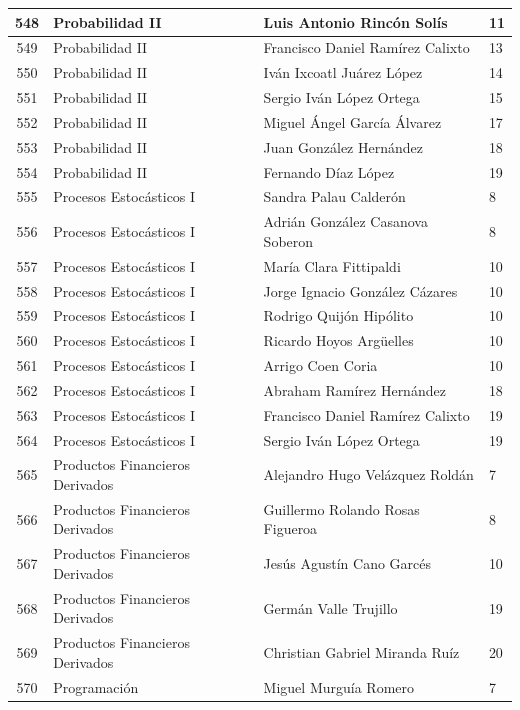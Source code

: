 {\begin{longtable}{|c|p{6.5cm}|p{5cm}|p{1.5cm}|}
  548 & Probabilidad II & Luis Antonio Rincón Solís & 11 \\ \hline
  549 & Probabilidad II & Francisco Daniel Ramírez Calixto & 13 \\ \hline
  550 & Probabilidad II & Iván Ixcoatl Juárez López & 14 \\ \hline
  551 & Probabilidad II & Sergio Iván López Ortega & 15 \\ \hline
  552 & Probabilidad II & Miguel Ángel García Álvarez & 17 \\ \hline
  553 & Probabilidad II & Juan González Hernández & 18 \\ \hline
  554 & Probabilidad II & Fernando Díaz López & 19 \\ \hline
  555 & Procesos Estocásticos I & Sandra Palau Calderón & 8 \\ \hline
  556 & Procesos Estocásticos I & Adrián González Casanova Soberon & 8 \\ \hline
  557 & Procesos Estocásticos I & María Clara Fittipaldi & 10 \\ \hline
  558 & Procesos Estocásticos I & Jorge Ignacio González Cázares & 10 \\ \hline
  559 & Procesos Estocásticos I & Rodrigo Quijón Hipólito & 10 \\ \hline
  560 & Procesos Estocásticos I & Ricardo Hoyos Argüelles & 10 \\ \hline
  561 & Procesos Estocásticos I & Arrigo Coen Coria & 10 \\ \hline
  562 & Procesos Estocásticos I & Abraham Ramírez Hernández & 18 \\ \hline
  563 & Procesos Estocásticos I & Francisco Daniel Ramírez Calixto & 19 \\ \hline
  564 & Procesos Estocásticos I & Sergio Iván López Ortega & 19 \\ \hline
  565 & Productos Financieros Derivados & Alejandro Hugo Velázquez Roldán & 7 \\ \hline
  566 & Productos Financieros Derivados & Guillermo Rolando Rosas Figueroa & 8 \\ \hline
  567 & Productos Financieros Derivados & Jesús Agustín Cano Garcés & 10 \\ \hline
  568 & Productos Financieros Derivados & Germán Valle Trujillo & 19 \\ \hline
  569 & Productos Financieros Derivados & Christian Gabriel Miranda Ruíz & 20 \\ \hline
  570 & Programación & Miguel Murguía Romero & 7 \\ \hline

\end{longtable}}
